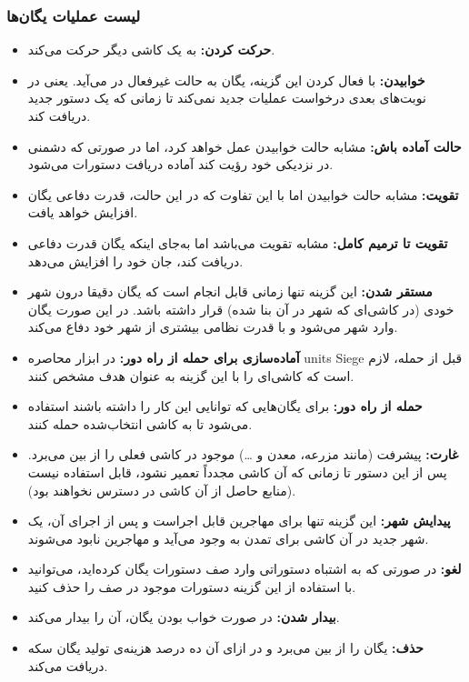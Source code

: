 \documentclass[]{article}
\begin{document}
\subsubsection*{{\titr لیست عملیات یگان‌ها}}
\begin{itemize}
\item \noindent \textbf{حرکت کردن:} 
به یک کاشی دیگر حرکت می‌کند.
\item \noindent \textbf{خوابیدن:} 
با فعال کردن این گزینه، یگان به حالت غیرفعال در می‌آید. یعنی در نوبت‌های بعدی درخواست عملیات جدید نمی‌کند تا زمانی که یک دستور جدید دریافت کند.
\item \noindent \textbf{حالت آماده باش:} 
مشابه حالت خوابیدن عمل خواهد کرد، اما در صورتی که دشمنی در نزدیکی خود رؤیت کند آماده دریافت دستورات می‌شود.
\item \noindent \textbf{تقویت:} 
مشابه حالت خوابیدن اما با این تفاوت که در این حالت، قدرت دفاعی یگان افزایش خواهد یافت.
\item \noindent \textbf{تقویت تا ترمیم کامل:}
مشابه تقویت می‌باشد اما به‌جای اینکه یگان قدرت دفاعی دریافت کند، جان خود را افزایش می‌دهد.
\item \noindent \textbf{مستقر شدن:} 
این گزینه تنها زمانی قابل انجام است که یگان دقیقا درون شهر خودی (در کاشی‌ای که شهر در آن بنا شده) قرار داشته باشد. در این صورت یگان وارد شهر می‌شود و با قدرت نظامی بیشتری از شهر خود دفاع می‌کند.
\item \noindent \textbf{آماده‌سازی برای حمله از راه دور:} 
در ابزار محاصره units Siege قبل از حمله، لازم است که کاشی‌ای را با این گزینه به عنوان هدف مشخص کنند.
\item \noindent \textbf{حمله از راه دور:} 
برای یگان‌هایی که توانایی این کار را داشته باشند استفاده می‌شود تا به کاشی انتخاب‌شده حمله کنند.
\item \noindent \textbf{غارت:} 
پیشرفت (مانند مزرعه، معدن و …) موجود در کاشی فعلی را از بین می‌برد. پس از این دستور تا زمانی که آن کاشی مجدداً تعمیر نشود، قابل استفاده نیست (منابع حاصل از آن کاشی در دسترس نخواهند بود).
\item \noindent \textbf{پیدایش شهر:}
این گزینه تنها برای مهاجرین قابل اجراست و پس از اجرای آن، یک شهر جدید در آن کاشی برای تمدن به وجود می‌آید و مهاجرین نابود می‌شوند.
\item \noindent \textbf{لغو:} 
در صورتی که به اشتباه دستوراتی وارد صف دستورات یگان کرده‌اید، می‌توانید با استفاده از این گزینه دستورات موجود در صف را حذف کنید.
\item \noindent \textbf{بیدار شدن:}
در صورت خواب بودن یگان، آن را بیدار می‌کند.
\item \noindent \textbf{حذف:} 
یگان را از بین می‌برد و در ازای آن ده درصد هزینه‌ی تولید یگان سکه دریافت می‌کند.
\end{itemize}
\end{document}
